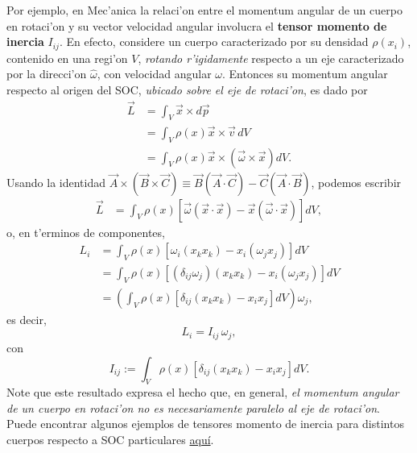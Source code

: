 Por ejemplo, en Mec'anica la relaci'on entre el momentum angular de un cuerpo en rotaci'on y su vector velocidad angular involucra el \textbf{tensor momento de inercia} $I_{ij}$. En efecto, considere un cuerpo caracterizado por su densidad $\rho(x_i)$, contenido en una regi'on $V$, \textit{rotando r'igidamente} respecto a un eje caracterizado por la direcci'on $\hat{\omega}$, con velocidad angular $\omega$. Entonces su momentum angular respecto al origen del SOC, \textit{ubicado sobre el eje de rotaci'on}, es dado por
\begin{align}
\vec{L} &= \int_V\vec{x}\times d\vec{p}\\
&= \int_V\rho(x)\vec{x}\times \vec{v}\,dV\\
&= \int_V\rho(x)\vec{x}\times \left(\vec{\omega}\times\vec{x}\right) dV.
\end{align}
Usando la identidad $\vec{A}\times (\vec{B}\times\vec{C})\equiv \vec{B}(\vec{A}\cdot\vec{C})-\vec{C}(\vec{A}\cdot\vec{B})$, podemos escribir
\begin{align}
\vec{L} &= \int_V\rho(x)\left[\vec{\omega}(\vec{x}\cdot\vec{x})-\vec{x}(\vec{\omega}\cdot\vec{x})\right] dV ,
\end{align}
o, en t'erminos de componentes,
\begin{align}
L_i &= \int_V\rho(x)\left[\omega_i(x_kx_k)-x_i(\omega_j x_j)\right]dV  \\
&= \int_V\rho(x)\left[(\delta_{ij}\omega_j)(x_kx_k)-x_i(\omega_j x_j)\right]dV  \\
&= \left(\int_V\rho(x)\left[\delta_{ij}(x_kx_k)-x_i x_j\right]dV \right) \omega_j ,
\end{align}
es decir,
\begin{equation}\label{LIo}
\boxed{L_i=I_{ij}\,\omega_j,}
\end{equation}
con 
\begin{equation}
\boxed{I_{ij}:=\int_V\rho(x)\left[\delta_{ij}(x_kx_k)-x_i x_j\right]dV .}
\end{equation}
Note que este resultado expresa el hecho que, en general, \textit{el momentum angular de un cuerpo en rotaci'on no es necesariamente paralelo al eje de rotaci'on}. Puede encontrar algunos ejemplos de tensores momento de inercia para distintos cuerpos respecto a SOC particulares \href{http://en.wikipedia.org/wiki/List_of_moment_of_inertia_tensors}{aqu\'i}.

